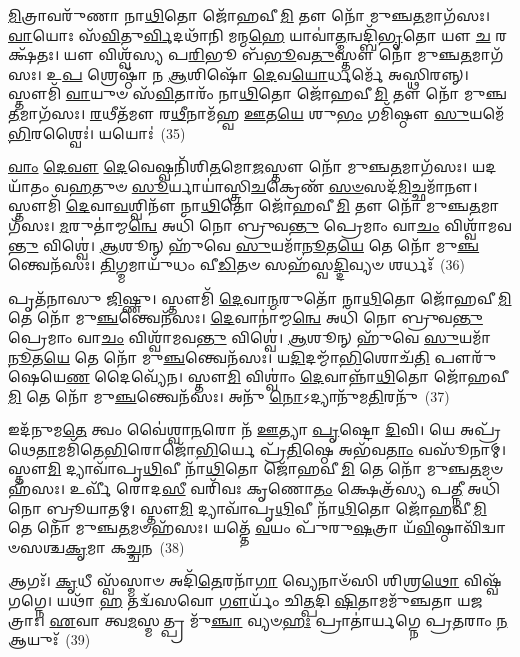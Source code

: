 \-\ul{𑌮𑌿}\-𑌤𑍍𑌰𑌾𑌵𑌰𑍁᳴𑌣𑌾 𑌨𑌾\-\ul{𑌥𑌿}\-𑌤𑍋 𑌜𑍋᳴𑌹𑌵𑍀\-\ul{𑌮𑌿} 𑌤𑍗 𑌨𑍋᳴ 𑌮𑍁𑌞𑍍𑌚\-\ul{𑌤}\-𑌮𑌾𑌗᳴𑌸𑌃। \ul{𑌵𑌾}\-𑌯𑍋𑌃 𑌸᳴\-\ul{𑌵𑌿}\-𑌤𑍁\-\ul{𑌰𑍍𑌵𑌿}\-𑌦𑌥𑌾᳴𑌨𑌿 𑌮𑌨𑍍𑌮\-\ul{𑌹𑍇} 𑌯𑌾𑌵𑌾॑\-\ul{𑌤𑍍𑌮}\-𑌨𑍍𑌵𑌦𑍍𑌬𑌿᳴\-\ul{𑌭𑍃}\-𑌤𑍋 𑌯𑍗 \ul{𑌚} 𑌰𑌕𑍍𑌷᳴𑌤𑌃। 𑌯𑍗 𑌵𑌿𑌶𑍍𑌵᳴𑌸𑍍𑌯 𑌪\-\ul{𑌰𑌿}\-𑌭𑍂 𑌬᳴\-\ul{𑌭𑍂}\-𑌵\-\ul{𑌤𑍁}\-𑌸𑍍𑌤𑍗 𑌨𑍋᳴ 𑌮𑍁𑌞𑍍𑌚\-\ul{𑌤}\-𑌮𑌾𑌗᳴𑌸𑌃। 𑌉\-\ul{𑌪} 𑌶𑍍𑌰𑍇𑌷𑍍𑌠𑌾᳴ 𑌨 \ul{𑌆}\-𑌶𑌿𑌷𑍋᳴ \ul{𑌦𑍇}\-𑌵\-\ul{𑌯𑍋}\-𑌰𑍍𑌧𑌰𑍍𑌮𑍇᳴ 𑌅𑌸𑍍𑌥𑌿𑌰𑌨𑍍𑌨𑍍। 𑌸𑍍𑌤𑍗𑌮𑌿᳴ \ul{𑌵𑌾}\-𑌯𑍁𑍞 𑌸᳴\-\ul{𑌵𑌿}\-𑌤𑌾𑌰𑌂᳴ 𑌨𑌾\-\ul{𑌥𑌿}\-𑌤𑍋 𑌜𑍋᳴𑌹𑌵𑍀\-\ul{𑌮𑌿} 𑌤𑍗 𑌨𑍋᳴ 𑌮𑍁𑌞𑍍𑌚\-\ul{𑌤}\-𑌮𑌾𑌗᳴𑌸𑌃। \ul{𑌰}\-𑌥𑍀𑌤᳴𑌮𑍗 𑌰\-\ul{𑌥𑍀}\-𑌨𑌾𑌮᳴𑌹𑍍𑌵 \ul{𑌊}\-𑌤\-\ul{𑌯𑍇} 𑌶𑍁\-\ul{𑌭𑌂} 𑌗𑌮𑌿᳴𑌷𑍍𑌠𑍗 \ul{𑌸𑍁}\-𑌯𑌮𑍇᳴\-\ul{𑌭𑌿}\-𑌰𑌶𑍍𑌵𑍈𑌃॑। 𑌯𑌯𑍋𑌃॑~(35)

\-\ul{𑌵𑌾𑌂} \ul{𑌦𑍇}\-\-\ul{𑌵𑍗} \ul{𑌦𑍇}\-𑌵𑍇𑌷𑍍𑌵𑌨𑌿᳴𑌶𑌿\-\ul{𑌤}\-𑌮𑍋\-\ul{𑌜}\-𑌸𑍍𑌤𑍗 𑌨𑍋᳴ 𑌮𑍁𑌞𑍍𑌚\-\ul{𑌤}\-𑌮𑌾𑌗᳴𑌸𑌃। 𑌯𑌦𑌯𑌾᳴𑌤𑌂 𑌵\-\ul{𑌹}\-𑌤𑍁𑍞 \ul{𑌸𑍂}\-𑌰𑍍𑌯𑌾𑌯𑌾॑𑌸𑍍𑌤𑍍𑌰𑌿\-\ul{𑌚}\-𑌕𑍍𑌰𑍇𑌣᳴ \ul{𑌸}\-\-\ul{𑍞}\-𑌸𑌦᳴\-\ul{𑌮𑌿}\-𑌚𑍍𑌛𑌮𑌾᳴𑌨𑍗। 𑌸𑍍𑌤𑍗𑌮𑌿᳴ \ul{𑌦𑍇}\-𑌵𑌾\-\ul{𑌵}\-𑌶𑍍𑌵𑌿𑌨𑍗᳴ 𑌨𑌾\-\ul{𑌥𑌿}\-𑌤𑍋 𑌜𑍋᳴𑌹𑌵𑍀\-\ul{𑌮𑌿} 𑌤𑍗 𑌨𑍋᳴ 𑌮𑍁𑌞𑍍𑌚\-\ul{𑌤}\-𑌮𑌾𑌗᳴𑌸𑌃। \ul{𑌮}\-𑌰𑍁𑌤𑌾॑𑌮𑍍𑌮\-\ul{𑌨𑍍𑌵𑍇} 𑌅𑌧𑌿᳴ 𑌨𑍋 𑌬𑍍𑌰𑍁𑌵\-\ul{𑌨𑍍𑌤𑍁} 𑌪𑍍𑌰𑍇𑌮𑌾𑌂 𑌵𑌾\-\ul{𑌚𑌂} 𑌵𑌿𑌶𑍍𑌵𑌾᳴𑌮𑌵\-\ul{𑌨𑍍𑌤𑍁} 𑌵𑌿𑌶𑍍𑌵𑍇॑। \ul{𑌆}\-𑌶𑍂𑌨𑍍 𑌹𑍁᳴𑌵𑍇 \ul{𑌸𑍁}\-𑌯𑌮𑌾᳴\-\ul{𑌨𑍂}\-𑌤\-\ul{𑌯𑍇} 𑌤𑍇 𑌨𑍋᳴ 𑌮𑍁\-\ul{𑌞𑍍𑌚}\-𑌨𑍍𑌤𑍍𑌵𑍇𑌨᳴𑌸𑌃। \ul{𑌤𑌿}\-𑌗𑍍𑌮𑌮𑌾𑌯𑍁᳴𑌧𑌂 𑌵𑍀\-\ul{𑌡𑌿}\-𑌤𑍞 𑌸𑌹᳴𑌸𑍍𑌵\-\ul{𑌦𑍍𑌦𑌿}\-𑌵𑍍𑌯𑍞 𑌶𑌰𑍍𑌧𑌃᳴~(36)

𑌪𑍃𑌤᳴𑌨𑌾𑌸𑍁 \ul{𑌜𑌿}\-𑌷𑍍𑌣𑍁। 𑌸𑍍𑌤𑍗𑌮𑌿᳴ \ul{𑌦𑍇}\-𑌵𑌾\-\ul{𑌨𑍍𑌮}\-𑌰𑍁𑌤𑍋᳴ 𑌨𑌾\-\ul{𑌥𑌿}\-𑌤𑍋 𑌜𑍋᳴𑌹𑌵𑍀\-\ul{𑌮𑌿} 𑌤𑍇 𑌨𑍋᳴ 𑌮𑍁\-\ul{𑌞𑍍𑌚}\-𑌨𑍍𑌤𑍍𑌵𑍇𑌨᳴𑌸𑌃। \ul{𑌦𑍇}\-𑌵𑌾𑌨𑌾॑𑌮𑍍𑌮\-\ul{𑌨𑍍𑌵𑍇} 𑌅𑌧𑌿᳴ 𑌨𑍋 𑌬𑍍𑌰𑍁𑌵\-\ul{𑌨𑍍𑌤𑍁} 𑌪𑍍𑌰𑍇𑌮𑌾𑌂 𑌵𑌾\-\ul{𑌚𑌂} 𑌵𑌿𑌶𑍍𑌵𑌾᳴𑌮𑌵\-\ul{𑌨𑍍𑌤𑍁} 𑌵𑌿𑌶𑍍𑌵𑍇॑। \ul{𑌆}\-𑌶𑍂𑌨𑍍 𑌹𑍁᳴𑌵𑍇 \ul{𑌸𑍁}\-𑌯𑌮𑌾᳴\-\ul{𑌨𑍂}\-𑌤\-\ul{𑌯𑍇} 𑌤𑍇 𑌨𑍋᳴ 𑌮𑍁\-\ul{𑌞𑍍𑌚}\-𑌨𑍍𑌤𑍍𑌵𑍇𑌨᳴𑌸𑌃। 𑌯\-\ul{𑌦𑌿}\-𑌦𑌮𑍍𑌮𑌾᳴\-\ul{𑌭𑌿}\-𑌶𑍋𑌚᳴\-\ul{𑌤𑌿} 𑌪𑍗𑌰𑍁᳴𑌷𑍇𑌯𑍇\-\ul{𑌣} 𑌦𑍈𑌵𑍍𑌯𑍇᳴𑌨। 𑌸𑍍𑌤𑍗\-\ul{𑌮𑌿} 𑌵𑌿𑌶𑍍𑌵𑌾𑌂॑ \ul{𑌦𑍇}\-𑌵𑌾𑌨𑍍𑌨𑌾᳴\-\ul{𑌥𑌿}\-𑌤𑍋 𑌜𑍋᳴𑌹𑌵𑍀\-\ul{𑌮𑌿} 𑌤𑍇 𑌨𑍋᳴ 𑌮𑍁\-\ul{𑌞𑍍𑌚}\-𑌨𑍍𑌤𑍍𑌵𑍇𑌨᳴𑌸𑌃। 𑌅𑌨𑍁᳴ \ul{𑌨𑍋}\-\-𑌽𑌦𑍍𑌯𑌾𑌨𑍁᳴𑌮\-\ul{𑌤𑌿}\-𑌰𑌨𑍁᳴~(37)

𑌇𑌦᳴𑌨𑍁𑌮\-\ul{𑌤𑍇} 𑌤𑍍𑌵𑌂 𑌵𑍈॑𑌶𑍍𑌵𑌾\-\ul{𑌨}\-𑌰𑍋 𑌨᳴ \ul{𑌊}\-𑌤𑍍𑌯𑌾 \ul{𑌪𑍃}\-𑌷𑍍𑌟𑍋 \ul{𑌦𑌿}\-𑌵𑌿। 𑌯𑍇 𑌅𑌪𑍍𑌰᳴𑌥𑍇\-\ul{𑌤𑌾}\-𑌮𑌮𑌿᳴𑌤𑍇\-\ul{𑌭𑌿}\-𑌰𑍋𑌜𑍋᳴\-\ul{𑌭𑌿}\-𑌰𑍍𑌯𑍇 𑌪𑍍𑌰᳴\-\ul{𑌤𑌿}\-𑌷𑍍𑌠𑍇 𑌅𑌭᳴𑌵\-\ul{𑌤𑌾𑌂} 𑌵𑌸𑍂᳴𑌨𑌾𑌮𑍍। 𑌸𑍍𑌤𑍗\-\ul{𑌮𑌿} 𑌦𑍍𑌯𑌾𑌵𑌾᳴𑌪𑍃\-\ul{𑌥𑌿}\-𑌵𑍀 𑌨𑌾᳴\-\ul{𑌥𑌿}\-𑌤𑍋 𑌜𑍋᳴𑌹𑌵𑍀\-\ul{𑌮𑌿} 𑌤𑍇 𑌨𑍋᳴ 𑌮𑍁𑌞𑍍𑌚\-\ul{𑌤}\-𑌮𑍞𑌹᳴𑌸𑌃। 𑌉𑌰𑍍𑌵𑍀᳴ 𑌰𑍋𑌦\-\ul{𑌸𑍀} 𑌵𑌰𑌿᳴𑌵𑌃 𑌕𑍃𑌣𑍋\-\ul{𑌤𑌂} 𑌕𑍍𑌷𑍇𑌤𑍍𑌰᳴𑌸𑍍𑌯 𑌪\-\ul{𑌤𑍍𑌨𑍀} 𑌅𑌧𑌿᳴ 𑌨𑍋 𑌬𑍍𑌰𑍂𑌯𑌾𑌤𑌮𑍍। 𑌸𑍍𑌤𑍗\-\ul{𑌮𑌿} 𑌦𑍍𑌯𑌾𑌵𑌾᳴𑌪𑍃\-\ul{𑌥𑌿}\-𑌵𑍀 𑌨𑌾᳴\-\ul{𑌥𑌿}\-𑌤𑍋 𑌜𑍋᳴𑌹𑌵𑍀\-\ul{𑌮𑌿} 𑌤𑍇 𑌨𑍋᳴ 𑌮𑍁𑌞𑍍𑌚\-\ul{𑌤}\-𑌮𑍞𑌹᳴𑌸𑌃। 𑌯𑌤𑍍𑌤𑍇᳴ \ul{𑌵}\-𑌯𑌂 𑌪𑍁᳴𑌰𑍁\-\ul{𑌷}\-𑌤𑍍𑌰𑌾 𑌯᳴\-\ul{𑌵𑌿}\-𑌷𑍍𑌠𑌾𑌵𑌿᳴𑌦𑍍𑌵𑌾𑍞𑌸𑌶𑍍𑌚\-\ul{𑌕𑍃}\-𑌮𑌾 𑌕\-\ul{𑌚𑍍𑌚}\-𑌨~(38)

𑌆𑌗𑌃᳴। \ul{𑌕𑍃}\-𑌧𑍀 𑌸𑍍𑌵᳴𑌸𑍍𑌮𑌾𑍞 𑌅𑌦𑌿᳴\-\ul{𑌤𑍇}\-𑌰𑌨𑌾᳴\-\ul{𑌗𑌾} 𑌵𑍍𑌯𑍇𑌨𑌾𑍞᳴𑌸𑌿 𑌶𑌿𑌶𑍍𑌰\-\ul{𑌥𑍋} 𑌵𑌿𑌷𑍍𑌵᳴𑌗𑌗𑍍𑌨𑍇। 𑌯𑌥𑌾᳴ \ul{𑌹} 𑌤𑌦𑍍𑌵᳴𑌸𑌵𑍋 \ul{𑌗𑍗}\-𑌰𑍍𑌯𑌂᳴ 𑌚𑌿\-\ul{𑌤𑍍𑌪}\-𑌦𑌿 \ul{𑌷𑌿}\-𑌤𑌾𑌮𑌮𑍁᳴𑌞𑍍𑌚𑌤𑌾 𑌯𑌜𑌤𑍍𑌰𑌾𑌃। \ul{𑌏}\-𑌵𑌾 𑌤𑍍𑌵\-\ul{𑌮}\-𑌸𑍍𑌮𑌤𑍍𑌪𑍍𑌰 𑌮𑍁᳴\-\ul{𑌞𑍍𑌚𑌾} 𑌵𑍍𑌯𑍞\-\ul{𑌹𑌃} 𑌪𑍍𑌰𑌾𑌤𑌾॑𑌰𑍍𑌯𑌗𑍍𑌨𑍇 𑌪𑍍𑌰\-\ul{𑌤}\-𑌰𑌾𑌂 \ul{𑌨} 𑌆𑌯𑍁𑌃᳴~(39)


{\anuvakamend[{𑌗𑌨𑍍𑌤𑌾᳴ \ul{𑌦𑍂}\-𑌷\-\ul{𑌯}\-𑌨𑍍𑌥𑍍𑌸𑍍𑌤𑍗\-\ul{𑌮𑌿} 𑌯\-\ul{𑌯𑍋𑌃} 𑌶𑌰𑍍𑌧𑍋\-𑌽𑌨𑍁᳴𑌮\-\ul{𑌤𑌿}\-𑌰𑌨𑍁᳴ \ul{𑌚}\-𑌨 𑌚𑌤𑍁᳴𑌸𑍍𑌤𑍍𑌰𑌿𑍞𑌶𑌚𑍍𑌚}]}%

{\anuvakamend[{\-\ul{𑌅}\-𑌗𑍍𑌨𑌿𑌷𑍍𑌟𑍍𑌵𑌾᳴ \ul{𑌵𑌾}\-𑌮\-\ul{𑌶𑍍𑌵𑍋} 𑌦𑍍𑌵𑌿𑌚᳴𑌤𑍍𑌵𑌾𑌰𑌿𑍞𑌶𑌚𑍍𑌚}]}%
